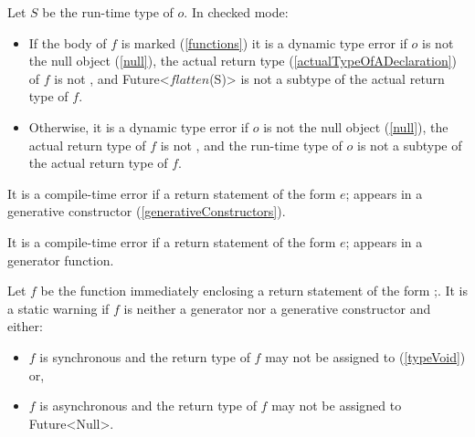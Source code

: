 \documentclass{article}
\newcommand{\code}[1]{{\sf #1}}
\begin{document}
\LMHash{}
Let $S$ be the run-time type of $o$. In checked mode:
\begin{itemize}
\item  If the body of $f$ is marked \ASYNC{} (\ref{functions})
it is a dynamic type error if $o$ is not the null object (\ref{null}),
the actual return type (\ref{actualTypeOfADeclaration}) of $f$ is not \VOID,
and \code{Future<$flatten$(S)>} is not a subtype of the actual return type of $f$.
\item Otherwise, it is a dynamic type error if $o$ is not the null object (\ref{null}),
the actual return type of $f$ is not \VOID{},
and the run-time type of $o$ is not a subtype of the actual return type of $f$.
\end{itemize}

\LMHash{}
It is a compile-time error if a return statement of the form \code{\RETURN{} $e$;} appears in a generative constructor (\ref{generativeConstructors}).


\LMHash{}
It is a compile-time error if a return statement of the form \code{\RETURN{} $e$;} appears in a generator function.


\LMHash{}
Let $f$ be the function immediately enclosing a return statement of the form \RETURN{};.
It is a static warning if $f$ is neither a generator nor a generative constructor and either:
\begin{itemize}
\item  $f$ is synchronous and the return type of $f$ may not be assigned to \VOID{} (\ref{typeVoid}) or,
\item  $f$ is asynchronous and the return type of $f$ may not be assigned to \code{Future<Null>}.
\end{itemize}
\end{document}
